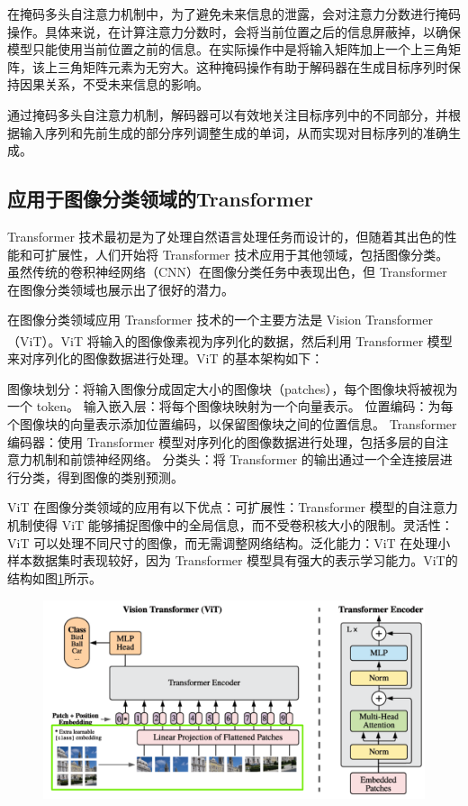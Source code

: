 在掩码多头自注意力机制中，为了避免未来信息的泄露，会对注意力分数进行掩码操作。具体来说，在计算注意力分数时，会将当前位置之后的信息屏蔽掉，以确保模型只能使用当前位置之前的信息。在实际操作中是将输入矩阵加上一个上三角矩阵，该上三角矩阵元素为无穷大。这种掩码操作有助于解码器在生成目标序列时保持因果关系，不受未来信息的影响。

通过掩码多头自注意力机制，解码器可以有效地关注目标序列中的不同部分，并根据输入序列和先前生成的部分序列调整生成的单词，从而实现对目标序列的准确生成。
\subsection{应用于图像分类领域的Transformer}
Transformer 技术最初是为了处理自然语言处理任务而设计的，但随着其出色的性能和可扩展性，人们开始将 Transformer 技术应用于其他领域，包括图像分类。虽然传统的卷积神经网络（CNN）在图像分类任务中表现出色，但 Transformer 在图像分类领域也展示出了很好的潜力。

在图像分类领域应用 Transformer 技术的一个主要方法是 Vision Transformer（ViT）\textsuperscript{\cite{dosovitskiy2020image}}。ViT 将输入的图像像素视为序列化的数据，然后利用 Transformer 模型来对序列化的图像数据进行处理。ViT 的基本架构如下：

图像块划分：将输入图像分成固定大小的图像块（patches），每个图像块将被视为一个 token。
输入嵌入层：将每个图像块映射为一个向量表示。
位置编码：为每个图像块的向量表示添加位置编码，以保留图像块之间的位置信息。
Transformer 编码器：使用 Transformer 模型对序列化的图像数据进行处理，包括多层的自注意力机制和前馈神经网络。
分类头：将 Transformer 的输出通过一个全连接层进行分类，得到图像的类别预测。

ViT 在图像分类领域的应用有以下优点：可扩展性：Transformer 模型的自注意力机制使得 ViT 能够捕捉图像中的全局信息，而不受卷积核大小的限制。灵活性：ViT 可以处理不同尺寸的图像，而无需调整网络结构。泛化能力：ViT 在处理小样本数据集时表现较好，因为 Transformer 模型具有强大的表示学习能力。ViT的结构如图\ref{fig:vit2}所示。

\begin{figure}[h]
	\centering 
	\includegraphics[width=15cm]{fig/ch2/vit2.png}
	\label{fig:vit2}
\end{figure}


